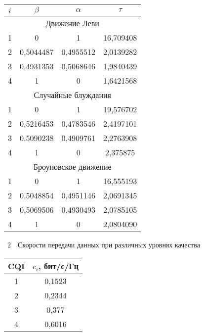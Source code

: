 \begin{multicols}{2}
{{\small
\begin{center}
{\tabcolsep=11.9pt
\begin{tabular}{|c|c|c|c|}
  \hline
$i$&$\beta$&$\alpha$&$\tau$\\
  \hline
\multicolumn{4}{|c|}{Движение Леви}\\
\hline
1&0&1&16,709408\hphantom{99}\\
2&0,5044487&0,4955512&2,0139282\\
3&0,4931353&0,5068646&1,9840439\\
4&1&0&1,6421568\\
\hline
\multicolumn{4}{|c|}{Случайные блуждания}\\
\hline
1&0&1&19,576702\hphantom{99}\\
2&0,5216453&0,4783546&2,4197101\\
3&0,5090238&0,4909761&2,2763908\\
4&1&0&2,375875\hphantom{9}\\
\hline
\multicolumn{4}{|c|}{Броуновское движение}\\
\hline
1&0&1&16,555193\hphantom{99}\\
2&0,5048854&0,4951146&2,0691345\\
3&0,5069506&0,4930493&2,0785105\\
4&1&0&2,0804090\\
\hline
\end{tabular}
}
\end{center}
}
}

\pagebreak
  
  
\addtocounter{table}{1}

 {   %
\noindent
\begin{center}
\parbox{43mm}{{{\tablename~2}\ \ \small{Скорости передачи данных при различных уровнях качества}}}


\vspace*{6pt}



{\tabcolsep=14pt
\small
\begin{tabular}{|c|c|}
\hline
CQI&$c_i$, бит/с/Гц\\
\hline
1&0,1523\\
2&0,2344\\
3&0,377\hphantom{9}\\
4&0,6016\\
\hline
\end{tabular}
}
\end{center}
}


\end{multicols}
